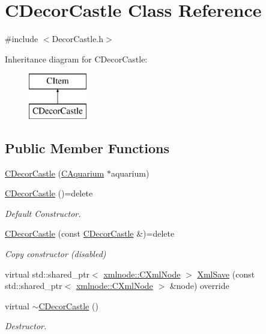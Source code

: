\hypertarget{class_c_decor_castle}{}\section{C\+Decor\+Castle Class Reference}
\label{class_c_decor_castle}


{\ttfamily \#include $<$Decor\+Castle.\+h$>$}

Inheritance diagram for C\+Decor\+Castle\+:\begin{figure}[H]
\begin{center}
\leavevmode
\includegraphics[height=2.000000cm]{class_c_decor_castle}
\end{center}
\end{figure}
\subsection*{Public Member Functions}
\begin{DoxyCompactItemize}
\item 
\mbox{\hyperlink{class_c_decor_castle_a9c88c926ea898a19ef6b726a722f39af}{C\+Decor\+Castle}} (\mbox{\hyperlink{class_c_aquarium}{C\+Aquarium}} $\ast$aquarium)
\item 
\mbox{\label{class_c_decor_castle_a5f0d27e7013bc141525986d2bd6cd3f3}} 
\mbox{\hyperlink{class_c_decor_castle_a5f0d27e7013bc141525986d2bd6cd3f3}{C\+Decor\+Castle}} ()=delete
\begin{DoxyCompactList}\small\item\em Default Constructor. \end{DoxyCompactList}\item 
\mbox{\label{class_c_decor_castle_a430a8ba95eb526bda2d966a63d11e73c}} 
\mbox{\hyperlink{class_c_decor_castle_a430a8ba95eb526bda2d966a63d11e73c}{C\+Decor\+Castle}} (const \mbox{\hyperlink{class_c_decor_castle}{C\+Decor\+Castle}} \&)=delete
\begin{DoxyCompactList}\small\item\em Copy constructor (disabled) \end{DoxyCompactList}\item 
virtual std\+::shared\+\_\+ptr$<$ \mbox{\hyperlink{classxmlnode_1_1_c_xml_node}{xmlnode\+::\+C\+Xml\+Node}} $>$ \mbox{\hyperlink{class_c_decor_castle_a83ecb7c898679e55dcafbc6492bc38d0}{Xml\+Save}} (const std\+::shared\+\_\+ptr$<$ \mbox{\hyperlink{classxmlnode_1_1_c_xml_node}{xmlnode\+::\+C\+Xml\+Node}} $>$ \&node) override
\item 
virtual \mbox{\hyperlink{class_c_decor_castle_a520ef2928c6d8a115200d64060b93c6f}{$\sim$\+C\+Decor\+Castle}} ()
\begin{DoxyCompactList}\small\item\em Destructor. \end{DoxyCompactList}\end{DoxyCompactItemize}
